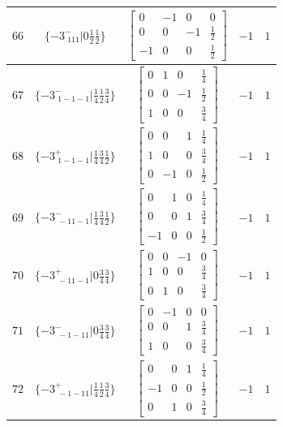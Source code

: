 \documentclass[fleqn,8pt]{jsarticle}
\begin{document}
\begin{longtable}{ccccc}
$ 66 $ & $ \{-3^{-}_{\,\,111}|0 \frac{1}{2} \frac{1}{2}\} $ & $ \begin{bmatrix} 0 & -1 & 0 & 0 \\ 0 & 0 & -1 & \frac{1}{2} \\ -1 & 0 & 0 & \frac{1}{2} \end{bmatrix} $ & $ -1 $ & $ 1 $ \\ \hline
$ 67 $ & $ \{-3^{-}_{\,\,1-1-1}|\frac{1}{4} \frac{1}{2} \frac{3}{4}\} $ & $ \begin{bmatrix} 0 & 1 & 0 & \frac{1}{4} \\ 0 & 0 & -1 & \frac{1}{2} \\ 1 & 0 & 0 & \frac{3}{4} \end{bmatrix} $ & $ -1 $ & $ 1 $ \\ \hline
$ 68 $ & $ \{-3^{+}_{\,\,1-1-1}|\frac{1}{4} \frac{3}{4} \frac{1}{2}\} $ & $ \begin{bmatrix} 0 & 0 & 1 & \frac{1}{4} \\ 1 & 0 & 0 & \frac{3}{4} \\ 0 & -1 & 0 & \frac{1}{2} \end{bmatrix} $ & $ -1 $ & $ 1 $ \\ \hline
$ 69 $ & $ \{-3^{-}_{\,\,-11-1}|\frac{1}{4} \frac{3}{4} \frac{1}{2}\} $ & $ \begin{bmatrix} 0 & 1 & 0 & \frac{1}{4} \\ 0 & 0 & 1 & \frac{3}{4} \\ -1 & 0 & 0 & \frac{1}{2} \end{bmatrix} $ & $ -1 $ & $ 1 $ \\ \hline
$ 70 $ & $ \{-3^{+}_{\,\,-11-1}|0 \frac{3}{4} \frac{3}{4}\} $ & $ \begin{bmatrix} 0 & 0 & -1 & 0 \\ 1 & 0 & 0 & \frac{3}{4} \\ 0 & 1 & 0 & \frac{3}{4} \end{bmatrix} $ & $ -1 $ & $ 1 $ \\ \hline
$ 71 $ & $ \{-3^{-}_{\,\,-1-11}|0 \frac{3}{4} \frac{3}{4}\} $ & $ \begin{bmatrix} 0 & -1 & 0 & 0 \\ 0 & 0 & 1 & \frac{3}{4} \\ 1 & 0 & 0 & \frac{3}{4} \end{bmatrix} $ & $ -1 $ & $ 1 $ \\ \hline
$ 72 $ & $ \{-3^{+}_{\,\,-1-11}|\frac{1}{4} \frac{1}{2} \frac{3}{4}\} $ & $ \begin{bmatrix} 0 & 0 & 1 & \frac{1}{4} \\ -1 & 0 & 0 & \frac{1}{2} \\ 0 & 1 & 0 & \frac{3}{4} \end{bmatrix} $ & $ -1 $ & $ 1 $ \\ \hline

\end{longtable}
\end{document}
